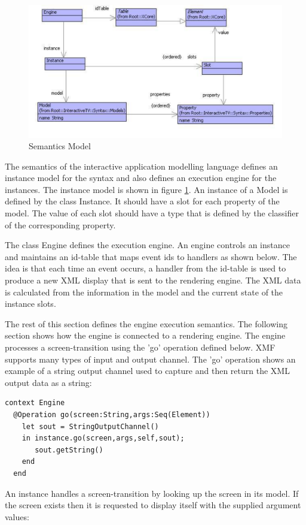 %
\begin{figure}
\begin{center}
\includegraphics[scale=0.6]{CaseStudy4/figures/Engine.pdf}

\caption{Semantics Model\label{fig:Semantics-Model}}
\end{center}
\end{figure}


The semantics of the interactive application modelling language defines
an instance model for the syntax and also defines an execution engine
for the instances. The instance model is shown in figure \ref{fig:Semantics-Model}.
An instance of a Model is defined by the class Instance. It should
have a slot for each property of the model. The value of each slot
should have a type that is defined by the classifier of the corresponding
property.

The class Engine defines the execution engine. An engine controls
an instance and maintains an id-table that maps event ids to handlers
as shown below. The idea is that each time an event occurs, a handler
from the id-table is used to produce a new XML display that is sent
to the rendering engine. The XML data is calculated from the information
in the model and the current state of the instance slots.

The rest of this section defines the engine execution semantics. The
following section shows how the engine is connected to a rendering
engine. The engine processes a screen-transition using the 'go' operation
defined below. XMF supports many types of input and output channel.
The 'go' operation shows an example of a string output channel used
to capture and then return the XML output data as a string:

\begin{lstlisting}
context Engine
  @Operation go(screen:String,args:Seq(Element))
    let sout = StringOutputChannel()
    in instance.go(screen,args,self,sout);
       sout.getString()
    end
  end
\end{lstlisting}An instance handles a screen-transition by looking up the screen in
its model. If the screen exists then it is requested to display itself
with the supplied argument values:

